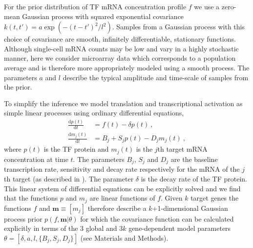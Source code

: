 \documentclass{pnastwo}
\begin{document}
\begin{article}
For the prior distribution of TF mRNA concentration profile $f$ we use a
zero-mean Gaussian process with squared exponential covariance
$k(t,t')=a\exp(-(t-t')^2/l^2)$. Samples from a Gaussian process with this choice
of covariance are smooth, infinitely differentiable, stationary functions. Although single-cell mRNA counts may be low
and vary in a highly stochastic manner, here we consider microarray data which
corresponds to a population average and is therefore more
appropriately modeled using a smooth process. The parameters $a$ and
$l$ describe the typical amplitude and time-scale of samples from
the prior. 

To simplify the inference we model translation and transcriptional
activation as simple linear processes using ordinary differential
equations,
\begin{align}
  \frac{\mathrm{d}p(t)}{\mathrm{d}t} & = f(t) - \delta
  p(t) \ , \label{eq:translation_ode} \\
  \frac{\mathrm{d}m_j(t)}{\mathrm{d}t} & = B_j+S_j p(t)-D_j m_j(t) \ , \label{eq:transcription_ode}
\end{align}
where $p(t)$ is the TF protein and $m_j(t)$ is the $j$th target mRNA
concentration at time $t$. The parameters $B_j$, $S_j$ and $D_j$ are the
baseline transcription rate, sensitivity and decay rate respectively
for the mRNA of the $j$th target (as described in \cite{Barenco2006a}).
The parameter $\delta$ is the decay rate of the TF protein.
This linear system of differential equations can be
explicitly solved and we find that the functions $p$ and $m_j$ are
linear functions of $f$. Given $k$ target genes the functions $f$ and $\bm m\equiv[m_j]$ therefore
describe a $k$+1-dimensional Gaussian process prior $p(f,\bm m|\theta)$
for which the covariance function can be calculated explicitly in terms of the
$3$ global and $3k$ gene-dependent model parameters
$\theta=[\delta,a,l,\{B_j,S_j,D_j\}]$ (see Materials and Methods). 


\end{article}
\end{document}
